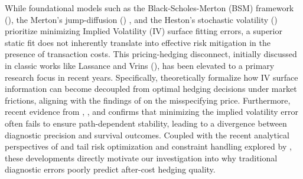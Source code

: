 While foundational models such as the Black-Scholes-Merton (BSM) framework (\cite{black1973pricing}), the Merton’s jump-diffusion (\cite{merton1976discontinuous}) , and the Heston’s stochastic volatility (\cite{heston1993closed}) prioritize minimizing Implied Volatility (IV) surface fitting errors, a superior static fit does not inherently translate into effective risk mitigation in the presence of transaction costs. This pricing-hedging disconnect, initially discussed in classic works like Lassance and Vrins (\cite{lassance2018comparison}), has been elevated to a primary research focus in recent years. Specifically, \cite{franccois2025difference} theoretically formalize how IV surface information can become decoupled from optimal hedging decisions under market frictions, aligning with the findings of \cite{hey2023cost} on the misspecifying price. Furthermore, recent evidence from \cite{bayer2025deep}, \cite{brugiere2025model}, and \cite{poddar2026uncertainty} confirms that minimizing the implied volatility error often fails to ensure path-dependent stability, leading to a divergence between diagnostic precision and survival outcomes. Coupled with the recent analytical perspectives of \cite{li2025analytic} and tail risk optimization and constraint handling explored by \cite{park2025robust}, these developments directly motivate our investigation into why traditional diagnostic errors poorly predict after-cost hedging quality.

